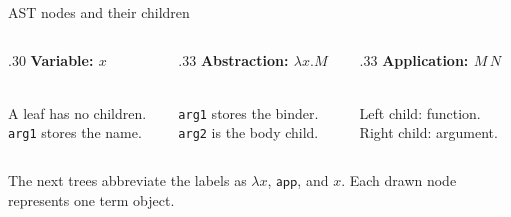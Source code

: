 \documentclass[aspectratio=169,11pt]{beamer}
\begin{document}
\begin{frame}{AST nodes and their children}
\begin{columns}[T]
\begin{column}{.30\textwidth}\centering
\textbf{Variable: $x$}\\[1em]
\\[1em]
A leaf has no children.\\[.6em]
\texttt{arg1} stores the name.
\end{column}
\begin{column}{.33\textwidth}\centering
\textbf{Abstraction: $\lambda x.M$}\\[1em]
\\[1em]
\texttt{arg1} stores the binder.\\[.6em]
\texttt{arg2} is the body child.
\end{column}
\begin{column}{.33\textwidth}\centering
\textbf{Application: $M\,N$}\\[1em]
\\[1em]
Left child: function.\\[.6em]
Right child: argument.
\end{column}
\end{columns}
\vfill
The next trees abbreviate the labels as $\lambda x$, $\mathsf{app}$, and $x$. Each drawn node represents one term object.
\end{frame}
\end{document}
